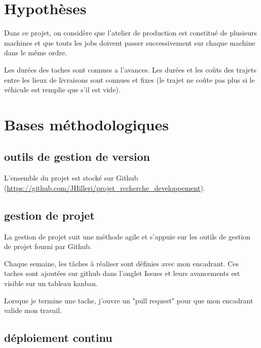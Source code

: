 \section{Hypothèses}
Dans ce projet, on considère que l'atelier de production est constitué de plusieurs machines et que touts les jobs doivent passer successivement sur chaque machine dans le même ordre.

Les durées des taches sont connues a l'avances.
Les durées et les coûts des trajets entre les lieux de livraisons sont connues et fixes (le trajet ne coûte pas plus si le véhicule est remplie que s'il est vide).


\section{Bases méthodologiques}
\subsection{outils de gestion de version}
L'ensemble du projet est stocké sur Github (\url{https://github.com/JHilleri/projet_recherche_developpement}).

\subsection{gestion de projet}
La gestion de projet suit une méthode agile et s'appuie sur les outils de gestion de projet fourni par Github.

Chaque semaine, les tâches à réaliser sont définies avec mon encadrant.
Ces taches sont ajoutées sur github dans l'onglet Issues et leurs avancements est visible sur un tableau kanban.

Lorsque je termine une tache, j'ouvre un "pull request" pour que mon encadrant valide mon travail.

\subsection{déploiement continu}
